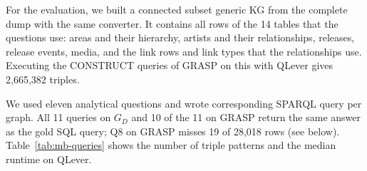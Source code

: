 For the evaluation, we built a connected subset generic KG from the complete dump with the same converter. It contains all rows of the 14 tables that the questions use: areas and their hierarchy, artists and their relationships, releases, release events, media, and the link rows and link types that the relationships use. Executing the CONSTRUCT queries of GRASP on this with QLever gives 2{,}665{,}382 triples. 

We used eleven analytical questions and wrote corresponding SPARQL query per graph. All 11 queries on \(G_D\) and 10 of the 11 on GRASP return the same answer as the gold SQL query; Q8 on GRASP misses 19 of 28{,}018 rows (see below). Table~\ref{tab:mb-queries} shows the number of triple patterns and the median runtime on QLever.

